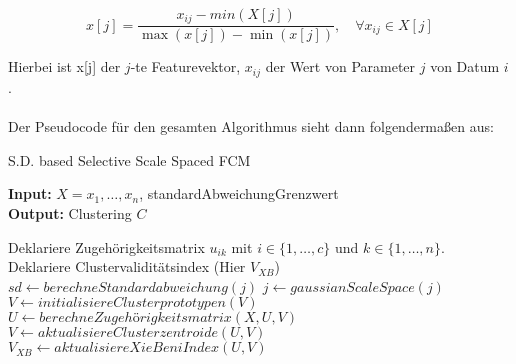 \documentclass[11pt,ceqn]{book}
\begin{document}
$$x[j] = \frac{x_{ij}-min(X[j])}{\max(x[j])-\min(x[j])},\quad \forall x_{ij} \in X[j]$$

Hierbei ist x[j] der $j$-te Featurevektor, $x_{ij}$ der Wert von Parameter $j$ von Datum $i$.
\\~\\
Der Pseudocode für den gesamten Algorithmus sieht dann folgendermaßen aus:

\begin{algorithm}[H]
\caption{ S.D. based Selective Scale Spaced FCM}\label{sdbsssfcm}
\hspace*{\algorithmicindent} \textbf{Input:} $X={x_1,\dots,x_n}$, standardAbweichungGrenzwert\\
 \hspace*{\algorithmicindent} \textbf{Output:} Clustering $C$ 
\begin{algorithmic}[1]
\State Deklariere Zugehörigkeitsmatrix $u_{ik}$ mit $i\in \{1,\dots,c\}$ und $k \in \{1,\dots,n\}$.
\State Deklariere Clustervaliditätsindex (Hier $V_{XB}$)
	\State $sd \gets berechneStandardabweichung(j)$
		 \State $j \gets gaussianScaleSpace(j)$ 
	\EndIf
\EndFor
\State $V\gets initialisiereClusterprototypen(V)$
	\State $U\gets berechneZugehörigkeitsmatrix(X,U,V)$
	\State $V\gets aktualisiereClusterzentroide(U,V)$
	\State $V_{XB} \gets aktualisiereXieBeniIndex(U,V)$
\EndWhile
\end{algorithmic}
\end{algorithm}
\end{document}
